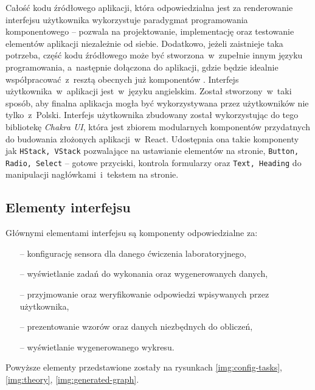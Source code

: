 Całość kodu źródłowego aplikacji, która odpowiedzialna jest za renderowanie interfejsu użytkownika
wykorzystuje paradygmat programowania komponentowego -- pozwala na projektowanie, implementację oraz
testowanie elementów aplikacji niezależnie od siebie. Dodatkowo, jeżeli zaistnieje taka potrzeba,
część kodu źródłowego może być stworzona~w~zupełnie innym języku programowania, a~następnie
dołączona do aplikacji, gdzie będzie idealnie współpracować~z~resztą obecnych już komponentów
\cite{component-programming}. Interfejs użytkownika~w~aplikacji jest~w~języku angielskim. Został
stworzony~w~taki sposób, aby finalna aplikacja mogła być wykorzystywana przez użytkowników nie
tylko~z~Polski. Interfejs użytkownika zbudowany został wykorzystując do tego bibliotekę
\textit{Chakra UI}, która jest zbiorem modularnych komponentów przydatnych do budowania złożonych
aplikacji~w~React. Udostępnia ona takie komponenty jak \texttt{HStack, VStack} pozwalające na
ustawianie elementów na stronie, \texttt{Button, Radio, Select} -- gotowe przyciski, kontrola
formularzy oraz \texttt{Text, Heading} do manipulacji nagłówkami~i~tekstem na stronie.

\subsection{Elementy interfejsu}
Głównymi elementami interfejsu są komponenty odpowiedzialne za:
\begin{itemize}
  \item[--] konfigurację sensora dla danego ćwiczenia laboratoryjnego,
  \item[--] wyświetlanie zadań do wykonania oraz wygenerowanych danych,
  \item[--] przyjmowanie oraz weryfikowanie odpowiedzi wpisywanych przez użytkownika,
  \item[--] prezentowanie wzorów oraz danych niezbędnych do obliczeń,
  \item[--] wyświetlanie wygenerowanego wykresu.
\end{itemize}
Powyższe elementy przedstawione zostały na rysunkach \ref{img:config-tasks}, \ref{img:theory},
\ref{img:generated-graph}.

\begingroup
{}

